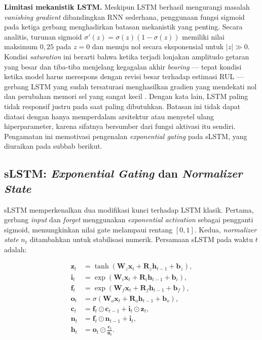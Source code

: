 \textbf{Limitasi mekanistik LSTM.} Meskipun LSTM berhasil mengurangi masalah
\emph{vanishing gradient} dibandingkan RNN sederhana, penggunaan fungsi
sigmoid pada ketiga gerbang menghadirkan batasan mekanistik yang penting.
Secara analitis, turunan sigmoid $\sigma'(z) = \sigma(z)(1 - \sigma(z))$
memiliki nilai maksimum $0{,}25$ pada $z = 0$ dan menuju nol secara
eksponensial untuk $|z| \gg 0$. Kondisi \emph{saturation} ini berarti bahwa
ketika terjadi lonjakan amplitudo getaran yang besar dan tiba-tiba menjelang
kegagalan akhir \emph{bearing} --- tepat kondisi ketika model harus merespons dengan
revisi besar terhadap estimasi RUL --- gerbang LSTM yang sudah tersaturasi
menghasilkan gradien yang mendekati nol dan perubahan memori sel yang sangat
kecil . Dengan kata lain, LSTM
paling tidak responsif justru pada saat paling dibutuhkan. Batasan ini tidak
dapat diatasi dengan hanya memperdalam arsitektur atau menyetel ulang
hiperparameter, karena sifatnya bersumber dari fungsi aktivasi itu sendiri.
Pengamatan ini memotivasi pengenalan \emph{exponential gating} pada sLSTM,
yang diuraikan pada subbab berikut.

\subsection{sLSTM: \emph{Exponential Gating} dan \emph{Normalizer State}}
\label{subsec:bab3_slstm}

sLSTM  memperkenalkan dua modifikasi kunci terhadap
LSTM klasik. Pertama, gerbang \emph{input} dan \emph{forget} menggunakan
\emph{exponential activation} sebagai pengganti sigmoid, memungkinkan nilai
gate melampaui rentang $[0, 1]$. Kedua, \emph{normalizer state} $n_t$ ditambahkan
untuk stabilisasi numerik. Persamaan sLSTM pada waktu $t$ adalah:

\begin{align}
  \mathbf{z}_t &= \tanh(\mathbf{W}_z \mathbf{x}_t + \mathbf{R}_z
    \mathbf{h}_{t-1} + \mathbf{b}_z), \label{eq:bab3_slstm_z} \\
  \mathbf{i}_t &= \exp(\mathbf{W}_i \mathbf{x}_t + \mathbf{R}_i
    \mathbf{h}_{t-1} + \mathbf{b}_i), \label{eq:bab3_slstm_i} \\
  \mathbf{f}_t &= \exp(\mathbf{W}_f \mathbf{x}_t + \mathbf{R}_f
    \mathbf{h}_{t-1} + \mathbf{b}_f), \label{eq:bab3_slstm_f} \\
  \mathbf{o}_t &= \sigma(\mathbf{W}_o \mathbf{x}_t + \mathbf{R}_o
    \mathbf{h}_{t-1} + \mathbf{b}_o), \label{eq:bab3_slstm_o} \\
  \mathbf{c}_t &= \mathbf{f}_t \odot \mathbf{c}_{t-1}
    + \mathbf{i}_t \odot \mathbf{z}_t, \label{eq:bab3_slstm_c} \\
  \mathbf{n}_t &= \mathbf{f}_t \odot \mathbf{n}_{t-1}
    + \mathbf{i}_t, \label{eq:bab3_slstm_n} \\
  \mathbf{h}_t &= \mathbf{o}_t \odot \frac{\mathbf{c}_t}{\mathbf{n}_t}.
    \label{eq:bab3_slstm_h}
\end{align}

